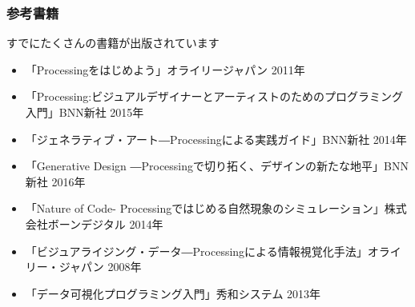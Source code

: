 \documentclass[10pt, dvipdfmx]{beamer}
\begin{document}
        \begin{frame}
            \frametitle{参考書籍}
            \tiny
            \begin{block}{すでにたくさんの書籍が出版されています}
                \begin{itemize}
                    \item 「Processingをはじめよう」オライリージャパン 2011年
                    \item 「Processing:ビジュアルデザイナーとアーティストのためのプログラミング入門」BNN新社 2015年
                    \item 「ジェネラティブ・アート―Processingによる実践ガイド」BNN新社 2014年
                    \item 「Generative Design ―Processingで切り拓く、デザインの新たな地平」BNN新社 2016年
                    \item 「Nature of Code- Processingではじめる自然現象のシミュレーション」株式会社ボーンデジタル 2014年
                    \item 「ビジュアライジング・データ―Processingによる情報視覚化手法」オライリー・ジャパン 2008年
                    \item 「データ可視化プログラミング入門」秀和システム 2013年
                \end{itemize}
            \end{block}
        \end{frame}

\end{document}
